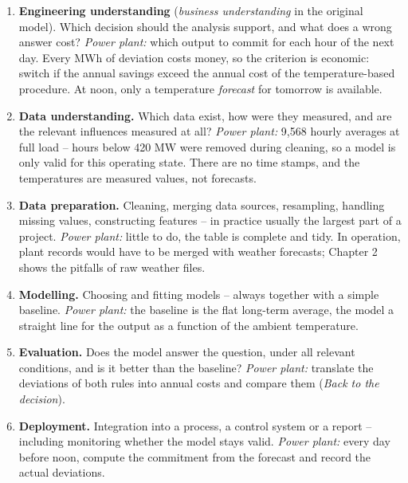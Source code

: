 \documentclass[
  letterpaper,
  DIV=11,
  numbers=noendperiod]{scrreprt}
\providecommand{\tightlist}{%
  \setlength{\itemsep}{0pt}\setlength{\parskip}{0pt}}\usepackage{longtable,booktabs,array}
\begin{document}
\begin{enumerate}
\def\labelenumi{\arabic{enumi}.}
\tightlist
\item
  \textbf{Engineering understanding} (\emph{business understanding} in
  the original model). Which decision should the analysis support, and
  what does a wrong answer cost? \emph{Power plant:} which output to
  commit for each hour of the next day. Every MWh of deviation costs
  money, so the criterion is economic: switch if the annual savings
  exceed the annual cost of the temperature-based procedure. At noon,
  only a temperature \emph{forecast} for tomorrow is available.
\item
  \textbf{Data understanding.} Which data exist, how were they measured,
  and are the relevant influences measured at all? \emph{Power plant:}
  9,568 hourly averages at full load -- hours below 420 MW were removed
  during cleaning, so a model is only valid for this operating state.
  There are no time stamps, and the temperatures are measured values,
  not forecasts.
\item
  \textbf{Data preparation.} Cleaning, merging data sources, resampling,
  handling missing values, constructing features -- in practice usually
  the largest part of a project. \emph{Power plant:} little to do, the
  table is complete and tidy. In operation, plant records would have to
  be merged with weather forecasts; Chapter 2 shows the pitfalls of raw
  weather files.
\item
  \textbf{Modelling.} Choosing and fitting models -- always together
  with a simple baseline. \emph{Power plant:} the baseline is the flat
  long-term average, the model a straight line for the output as a
  function of the ambient temperature.
\item
  \textbf{Evaluation.} Does the model answer the question, under all
  relevant conditions, and is it better than the baseline? \emph{Power
  plant:} translate the deviations of both rules into annual costs and
  compare them (\emph{Back to the decision}).
\item
  \textbf{Deployment.} Integration into a process, a control system or a
  report -- including monitoring whether the model stays valid.
  \emph{Power plant:} every day before noon, compute the commitment from
  the forecast and record the actual deviations.
\end{enumerate}
\end{document}
